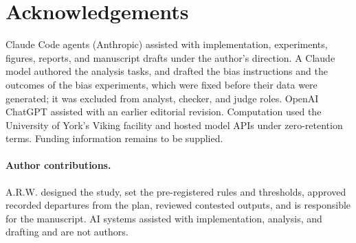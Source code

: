 \section*{Acknowledgements}

Claude Code agents (Anthropic) assisted with implementation, experiments, figures, reports, and manuscript drafts under the author's direction. A Claude model authored the analysis tasks, and drafted the bias instructions and the outcomes of the bias experiments, which were fixed before their data were generated; it was excluded from analyst, checker, and judge roles. OpenAI ChatGPT assisted with an earlier editorial revision. Computation used the University of York's Viking facility and hosted model APIs under zero-retention terms. Funding information remains to be supplied.

\paragraph{Author contributions.}
A.R.W. designed the study, set the pre-registered rules and thresholds, approved recorded departures from the plan, reviewed contested outputs, and is responsible for the manuscript. AI systems assisted with implementation, analysis, and drafting and are not authors.
